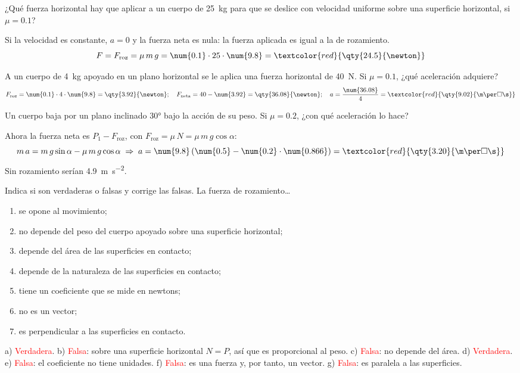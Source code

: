 \begin{example}
    ¿Qué fuerza horizontal hay que aplicar a un cuerpo de \qty{25}{\kg} para que se deslice con velocidad uniforme sobre una superficie horizontal, si \(\mu = \num{0.1}\)?

    Si la velocidad es constante, \(a = 0\) y la fuerza neta es nula: la fuerza aplicada es igual a la de rozamiento.
    \[ F = F_\text{roz} = \mu\,m\,g = \num{0.1} \cdot 25 \cdot \num{9.8} = \textcolor{red}{\qty{24.5}{\newton}} \]
\end{example}

\begin{example}
    A un cuerpo de \qty{4}{\kg} apoyado en un plano horizontal se le aplica una fuerza horizontal de \qty{40}{\newton}. Si \(\mu = \num{0.1}\), ¿qué aceleración adquiere?
    \[ F_\text{roz} = \num{0.1} \cdot 4 \cdot \num{9.8} = \qty{3.92}{\newton}; \quad F_\text{neta} = 40 - \num{3.92} = \qty{36.08}{\newton}; \quad a = \frac{\num{36.08}}{4} = \textcolor{red}{\qty{9.02}{\m\per\square\s}} \]
\end{example}

\begin{example}
    Un cuerpo baja por un plano inclinado \ang{30} bajo la acción de su peso. Si \(\mu = \num{0.2}\), ¿con qué aceleración lo hace?

    Ahora la fuerza neta es \(P_1 - F_\text{roz}\), con \(F_\text{roz} = \mu\,N = \mu\,m\,g\cos\alpha\):
    \[ m\,a = m\,g\sin\alpha - \mu\,m\,g\cos\alpha \;\Rightarrow\; a = \num{9.8}\,(\num{0.5} - \num{0.2} \cdot \num{0.866}) = \textcolor{red}{\qty{3.20}{\m\per\square\s}} \]
    Sin rozamiento serían \qty{4.9}{\m\per\square\s}.
\end{example}

\begin{exercise}
    Indica si son verdaderas o falsas y corrige las falsas. La fuerza de rozamiento\ldots
    \begin{enumerate}[label=\alph*)]
        \item se opone al movimiento;
        \item no depende del peso del cuerpo apoyado sobre una superficie horizontal;
        \item depende del área de las superficies en contacto;
        \item depende de la naturaleza de las superficies en contacto;
        \item tiene un coeficiente que se mide en newtons;
        \item no es un vector;
        \item es perpendicular a las superficies en contacto.
    \end{enumerate}
    \begin{solu}
        a) \textcolor{red}{Verdadera}. b) \textcolor{red}{Falsa}: sobre una superficie horizontal \(N = P\), así que es proporcional al peso. c) \textcolor{red}{Falsa}: no depende del área. d) \textcolor{red}{Verdadera}. e) \textcolor{red}{Falsa}: el coeficiente no tiene unidades. f) \textcolor{red}{Falsa}: es una fuerza y, por tanto, un vector. g) \textcolor{red}{Falsa}: es paralela a las superficies.
    \end{solu}
\end{exercise}


